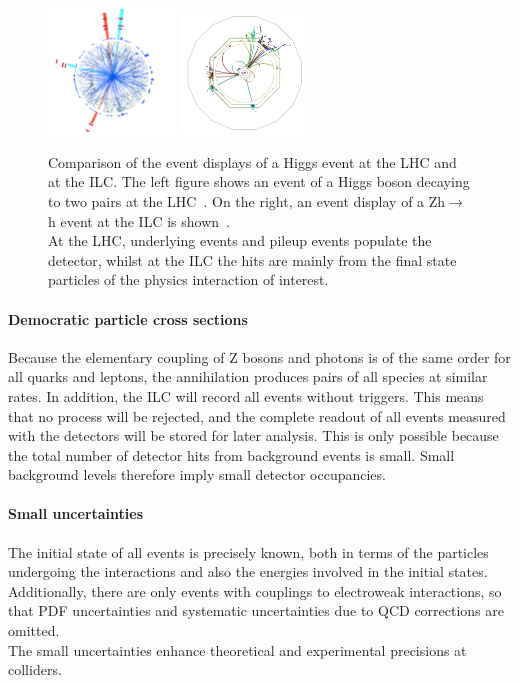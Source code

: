 \begin{figure}
\centering
\includegraphics[width=0.3\textwidth]{Figures/ATLAS_event_display.png}
\includegraphics[width=0.3\textwidth]{Figures/ILD_event_display.png}
\caption[Clean environment at the ILC]{Comparison of the event displays of a Higgs event at the  LHC and at the ILC.
The left figure shows an event of a Higgs boson decaying to two \positron\electron pairs at the LHC~\cite{ATLAS_event_display}.
On the right, an event display of a Zh$\rightarrow$\positron\electron h event at the ILC is shown~\cite{ILD_event_display}.
\\At the LHC, underlying events and pileup events populate the detector, whilst at the ILC the hits are mainly from the final state particles of the physics interaction of interest.
}
\label{fig:Cleanliness}
\end{figure}

\paragraph{Democratic particle cross sections}
Because the elementary coupling of Z bosons and photons is of the same order for all quarks and leptons, the \positron\electron annihilation produces pairs of all species at similar rates.
In addition, the ILC will record all events without triggers.
This means that no process will be rejected, and the complete readout of all events measured with the detectors will be stored for later analysis.
This is only possible because the total number of detector hits from background events is small.
Small background levels therefore imply small detector occupancies.

\paragraph{Small uncertainties}
The initial state of all events is precisely known, both in terms of the particles undergoing the interactions and also the energies involved in the initial states.
Additionally, there are only events with couplings to electroweak interactions, so that PDF uncertainties and systematic uncertainties due to QCD corrections are omitted.
\\The small uncertainties enhance theoretical and experimental precisions at \positron\electron colliders.

